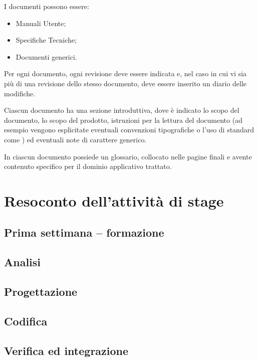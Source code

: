 I documenti possono essere:

\begin{itemize}
\item Manuali Utente;
\item Specifiche Tecniche;
\item Documenti generici.
\end{itemize}

Per ogni documento, ogni revisione deve essere indicata e, nel caso in cui vi
sia più di una revisione dello stesso documento, deve essere inserito un
diario delle modifiche.

Ciascun documento ha una sezione introduttiva, dove è indicato lo scopo del
documento, lo scopo del prodotto, istruzioni per la lettura del documento (ad
esempio vengono esplicitate eventuali convenzioni tipografiche o l'uso di
standard come ) ed eventuali note di carattere generico.

In ciascun documento possiede un glossario, collocato nelle pagine finali e
avente contenuto specifico per il dominio applicativo trattato.

\section{Resoconto dell'attività di stage}

\subsection{Prima settimana -- formazione}

\subsection{Analisi}

\subsection{Progettazione}

\subsection{Codifica}

\subsection{Verifica ed integrazione}

